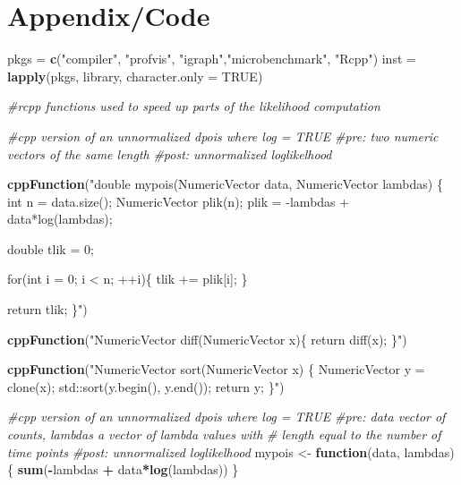 \documentclass[11pt,a4paper]{article}
\newenvironment{Shaded}{\begin{snugshade}}{\end{snugshade}}
\newcommand{\CommentTok}[1]{\textcolor[rgb]{0.56,0.35,0.01}{\textit{#1}}}
\newcommand{\ControlFlowTok}[1]{\textcolor[rgb]{0.13,0.29,0.53}{\textbf{#1}}}
\newcommand{\DataTypeTok}[1]{\textcolor[rgb]{0.13,0.29,0.53}{#1}}
\newcommand{\KeywordTok}[1]{\textcolor[rgb]{0.13,0.29,0.53}{\textbf{#1}}}
\newcommand{\NormalTok}[1]{#1}
\newcommand{\OperatorTok}[1]{\textcolor[rgb]{0.81,0.36,0.00}{\textbf{#1}}}
\newcommand{\OtherTok}[1]{\textcolor[rgb]{0.56,0.35,0.01}{#1}}
\newcommand{\StringTok}[1]{\textcolor[rgb]{0.31,0.60,0.02}{#1}}
\begin{document}
\pagebreak

\hypertarget{appendixcode}{%
\section{Appendix/Code}\label{appendixcode}}

\begin{Shaded}
\begin{Highlighting}[]
\NormalTok{pkgs =}\StringTok{ }\KeywordTok{c}\NormalTok{(}\StringTok{"compiler"}\NormalTok{, }\StringTok{"profvis"}\NormalTok{, }\StringTok{"igraph"}\NormalTok{,}\StringTok{"microbenchmark"}\NormalTok{, }\StringTok{"Rcpp"}\NormalTok{)}
\NormalTok{inst =}\StringTok{ }\KeywordTok{lapply}\NormalTok{(pkgs, library, }\DataTypeTok{character.only =} \OtherTok{TRUE}\NormalTok{)}
\end{Highlighting}
\end{Shaded}

\begin{Shaded}
\begin{Highlighting}[]
\CommentTok{#rcpp functions used to speed up parts of the likelihood computation}

\CommentTok{#cpp version of an unnormalized dpois where log = TRUE}
\CommentTok{#pre: two numeric vectors of the same length}
\CommentTok{#post: unnormalized loglikelhood}

\KeywordTok{cppFunction}\NormalTok{(}\StringTok{"double mypois(NumericVector data, NumericVector lambdas) \{}
\StringTok{  int n = data.size();}
\StringTok{  NumericVector plik(n);}
\StringTok{  plik = -lambdas + data*log(lambdas);}

\StringTok{  double tlik = 0;}

\StringTok{  for(int i = 0; i < n; ++i)\{}
\StringTok{    tlik += plik[i];}
\StringTok{  \}}

\StringTok{  return tlik;}
\StringTok{  \}"}\NormalTok{)}

\KeywordTok{cppFunction}\NormalTok{(}\StringTok{"NumericVector diff(NumericVector x)\{}
\StringTok{   return diff(x);}
\StringTok{\}"}\NormalTok{)}

\KeywordTok{cppFunction}\NormalTok{(}\StringTok{"NumericVector sort(NumericVector x) \{}
\StringTok{   NumericVector y = clone(x);}
\StringTok{   std::sort(y.begin(), y.end());}
\StringTok{   return y;}
\StringTok{\}"}\NormalTok{)}
\end{Highlighting}
\end{Shaded}

\begin{Shaded}
\begin{Highlighting}[]
\CommentTok{#cpp version of an unnormalized dpois where log = TRUE}
\CommentTok{#pre: data vector of counts, lambdas a vector of lambda values with }
\CommentTok{# length equal to the number of time points}
\CommentTok{#post: unnormalized loglikelhood}
\NormalTok{mypois <-}\StringTok{ }\ControlFlowTok{function}\NormalTok{(data, lambdas) \{}
  \KeywordTok{sum}\NormalTok{(}\OperatorTok{-}\NormalTok{lambdas }\OperatorTok{+}\StringTok{ }\NormalTok{data}\OperatorTok{*}\KeywordTok{log}\NormalTok{(lambdas))}
\NormalTok{\}}
\end{Highlighting}
\end{Shaded}
\end{document}
